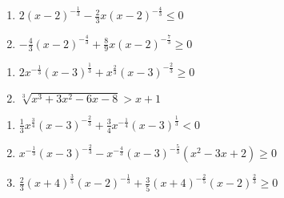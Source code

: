 \begin{multicols}{2}
\begin{enumerate}
\setcounter{enumi}{\value{HW}}


\item  $2 (x-2)^{-\frac{1}{3}} -\frac{2}{3} x(x-2)^{-\frac{4}{3}} \leq 0$
\item  $-\frac{4}{3} (x-2)^{-\frac{4}{3}} + \frac{8}{9} x (x-2)^{-\frac{7}{3}} \geq 0$

\setcounter{HW}{\value{enumi}}
\end{enumerate}
\end{multicols}

\begin{multicols}{2}
\begin{enumerate}
\setcounter{enumi}{\value{HW}}


\item  $2x^{-\frac{1}{3}}(x-3)^{\frac{1}{3}} + x^{\frac{2}{3}} (x-3)^{-\frac{2}{3}} \geq 0$
\item $\sqrt[3]{x^{3} + 3x^{2} - 6x - 8} > x + 1$


\setcounter{HW}{\value{enumi}}
\end{enumerate}
\end{multicols}

\begin{enumerate}
\setcounter{enumi}{\value{HW}}

\item $\frac{1}{3}x^{\frac{3}{4}}(x - 3)^{-\frac{2}{3}} + \frac{3}{4}x^{-\frac{1}{4}}(x - 3)^{\frac{1}{3}} < 0$
\item $x^{-\frac{1}{3}} (x-3)^{-\frac{2}{3}} - x^{-\frac{4}{3}} (x-3)^{-\frac{5}{3}} (x^2-3x+2) \geq 0$ 
\item $\frac{2}{3}(x + 4)^{\frac{3}{5}}(x - 2)^{-\frac{1}{3}} + \frac{3}{5}(x + 4)^{-\frac{2}{5}}(x - 2)^{\frac{2}{3}} \geq 0$ \label{algineqexlast}



\setcounter{HW}{\value{enumi}}
\end{enumerate}

